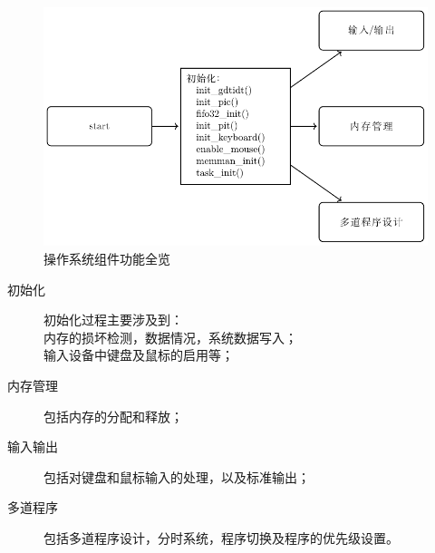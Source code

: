 \begin{figure}[H]
  \centering
  \includegraphics[width=.8\textwidth]{../Fig/func/run.pdf}
  \caption{操作系统组件功能全览}
  \label{fig:run}
\end{figure}

\begin{description}
  \item[初始化] 初始化过程主要涉及到：\\
  内存的损坏检测，数据情况，系统数据写入；\\
  输入设备中键盘及鼠标的启用等；
  \item[内存管理] 包括内存的分配和释放；
  \item[输入输出] 包括对键盘和鼠标输入的处理，以及标准输出；
  \item[多道程序] 包括多道程序设计，分时系统，程序切换及程序的优先级设置。
\end{description}